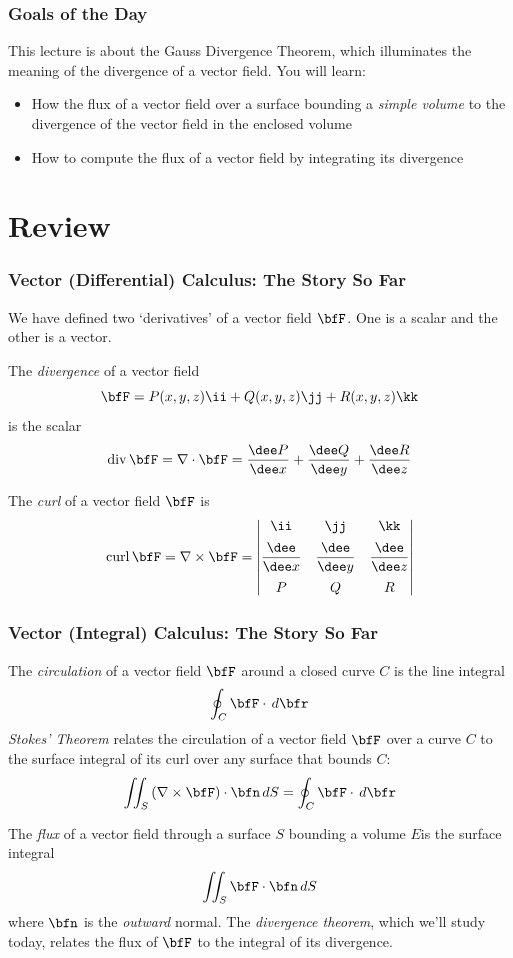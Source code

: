 \documentclass[notes=show,10pt]{beamer}
\begin{document}
\begin{frame}
\frametitle{Goals of the Day}
This lecture is about the Gauss Divergence Theorem,  which illuminates the meaning of the divergence of a vector field. You will learn:

\bigskip

\begin{itemize}
\item	How the flux of a vector field over a surface bounding a \emph{simple volume} to the divergence of 
the vector field in the enclosed volume
\item	How to compute the flux of a vector field by integrating its divergence 
\end{itemize}
\end{frame}

\section{Review}

\begin{frame}
\frametitle{Vector (Differential) Calculus: The Story So Far}
\footnotesize
We have defined two `derivatives' of a vector field $\bfF$. One is a scalar and the other is a vector.

\medskip

The \emph{divergence} of a vector field 
$$\bfF = P(x,y,z) \ii + Q(x,y,z) \jj + R(x,y,z) \kk$$ 
is the scalar
$$ \mathrm{div} \, \bfF = \nabla \cdot \bfF = \frac{\dee P}{\dee x} + \frac{\dee Q}{\dee y} + \frac{\dee R}{\dee z}
$$

\vfill

The \emph{curl} of a vector field $\bfF$ is 
$$ 
\mathrm{curl} \, \bfF = \nabla \times \bfF =
\begin{vmatrix}
\ii							&		\jj							&		\kk		\\[5pt]
\dfrac{\dee}{\dee x}	&	 	\dfrac{\dee}{\dee y}	&	\dfrac{\dee}{\dee z}	\\[10pt]
P							&		Q							&	R
\end{vmatrix}
$$

\end{frame}

\begin{frame}
\frametitle{Vector (Integral) Calculus: The Story So Far}
\footnotesize
The \emph{circulation} of a vector field $\bfF$ around a closed curve $C$ is the line integral 
$$ \oint_C \bfF \cdot \, d\bfr $$
\emph{Stokes' Theorem} relates the circulation of a vector field $\bfF$ over a curve $C$ to the surface integral of its curl over any surface that bounds $C$:
$$ \iint_S \left( \nabla \times \bfF\right)  \cdot \bfn \, dS = \oint_C \bfF \cdot \, d\bfr $$

\vfill
The \emph{flux} of a vector field through a surface $S$ bounding a volume $E$is the 
surface integral
$$ \iint_S \bfF \cdot \bfn \, dS $$
where $\bfn$ is the \emph{outward} normal.  The \emph{divergence theorem}, which we'll study today, relates the flux of $\bfF$ to the integral of its divergence. 
\end{frame}
\end{document}
